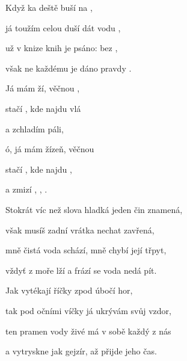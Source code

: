 

\zs
Když ka deště buší na  ,

já toužím celou duší dát  vodu ,

už v knize knih je psáno: bez   ,

však ne každému je dáno  pravdy .
\ks

\zr
Já mám ží, věčnou , 

stačí , kde najdu vlá

a zchladím  páli,

ó, já mám žízeň, věčnou 

stačí , kde najdu ,

a zmizí , , .
\kr

\zs
Stokrát víc než slova hladká jeden čin znamená,

však musíš zadní vrátka nechat zavřená,

mně čistá voda schází, mně chybí její třpyt,

vždyť z moře lží a frází se voda nedá pít.
\ks

\zr  \kr

\zs
Jak vytékají říčky zpod úbočí hor,

tak pod očními víčky já ukrývám svůj vzdor,

ten pramen vody živé má v sobě každý z nás

a vytryskne jak gejzír, až přijde jeho čas.
\ks

\zr  \kr  \zr  \kr

\kp










